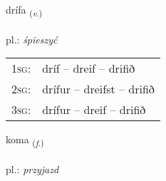 \documentclass[frontgrid, backgrid]{flacards}\usepackage[]{graphicx}\usepackage[]{xcolor}
\begin{document}
\renewcommand{\flhead}{\vskip5pt \fboxsep=0pt {\small\bfseries\footnotesize Sagnorð | czasownik}}
\renewcommand{\fcfoot}{\vskip5pt \fboxsep=0pt \hspace{2pt}{\small\bfseries\footnotesize 3K}}

\renewcommand{\blhead}{\vskip5pt {\small\bfseries\footnotesize Sagnorð | czasownik }}
\renewcommand{\bcfoot}{\vskip5pt \hspace{2pt}{\small\bfseries\footnotesize 3K}}


{drífa \small{\textsubscript{(\textit{v.})}} \\[1ex] %
\textphonetic{[triːva]} \\
pl.: \emph{śpieszyć} \\  [2ex]
\renewcommand*{\arraystretch}{0.8}
\begin{tabular}{p{1cm}l}
\textsc{1sg}: & dríf -- dreif -- drifið \\ 
\textsc{2sg}: & drífur -- dreifst -- drifið \\ 
\textsc{3sg}: & drífur -- dreif -- drifið \\ 
\end{tabular}
}

\renewcommand{\flhead}{\vskip5pt \fboxsep=0pt {\small\bfseries\footnotesize Nafnorð | rzeczownik}}
\renewcommand{\fcfoot}{\vskip5pt \fboxsep=0pt \hspace{2pt}{\small\bfseries\footnotesize 3K}}

\renewcommand{\blhead}{\vskip5pt {\small\bfseries\footnotesize Nafnorð | rzeczownik }}
\renewcommand{\bcfoot}{\vskip5pt \hspace{2pt}{\small\bfseries\footnotesize 3K}}


{koma \small{\textsubscript{(\textit{f.})}} \\[1ex] %
\textphonetic{[kʰɔːma]} \\
pl.: \emph{przyjazd} \\  [2ex]
\renewcommand*{\arraystretch}{0.8}
}
\end{document}
